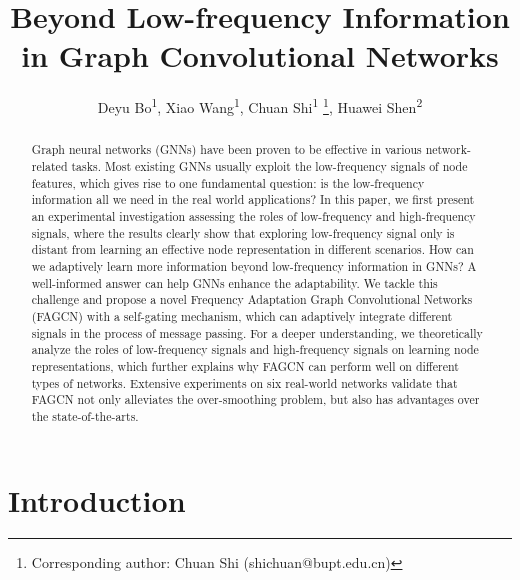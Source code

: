 \documentclass[letterpaper]{article} %
\title{Beyond Low-frequency Information in Graph Convolutional Networks}
\author{
	Deyu Bo\textsuperscript{\rm 1},
	Xiao Wang\textsuperscript{\rm 1},
	Chuan Shi\textsuperscript{\rm 1}	\thanks{Corresponding author: Chuan Shi (shichuan@bupt.edu.cn)},
	Huawei Shen\textsuperscript{\rm 2}
}
\begin{document}
\maketitle

\begin{abstract}
Graph neural networks (GNNs) have been proven to be effective in various network-related tasks. Most existing GNNs usually exploit the low-frequency signals of node features, which gives rise to one fundamental question: is the low-frequency information all we need in the real world applications? 
In this paper, we first present an experimental investigation assessing the roles of low-frequency and high-frequency signals, where the results clearly show that exploring low-frequency signal only is distant from learning an effective node representation in different scenarios. How can we adaptively learn more information beyond low-frequency information in GNNs? A well-informed answer can help GNNs enhance the adaptability. We tackle this challenge and propose a novel Frequency Adaptation Graph Convolutional Networks (FAGCN) with a self-gating mechanism, which can adaptively integrate different signals in the process of message passing. 
For a deeper understanding, we theoretically analyze the roles of low-frequency signals and high-frequency signals on learning node representations, which further explains why FAGCN can perform well on different types of networks.
Extensive experiments on six real-world networks validate that FAGCN not only alleviates the over-smoothing problem, but also has advantages over the state-of-the-arts.
\end{abstract}

\section{Introduction}
\label{introduction}
\end{document}
